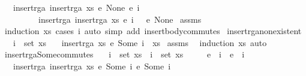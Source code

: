 \begin{isabellebody}
\ \ \ {\isachardoublequoteopen}insert{\isacharunderscore}rga\ {\isacharparenleft}insert{\isacharunderscore}rga\ xs\ {\isacharparenleft}e{}{\isacharcomma}\ None{\isacharparenright}{\isacharparenright}\ {\isacharparenleft}e{}{\isacharcomma}\ i{}\ \ {\isacharparenright}\ {\isacharequal}\isanewline
\ \ \ \ \ \ \ \ \ insert{\isacharunderscore}rga\ {\isacharparenleft}insert{\isacharunderscore}rga\ xs\ {\isacharparenleft}e{}{\isacharcomma}\ i{}\ \ {\isacharparenright}{\isacharparenright}\ {\isacharparenleft}e{}{\isacharcomma}\ None{\isacharparenright}{\isachardoublequoteclose}\isanewline
%
\isadelimproof
%
\endisadelimproof
%
\isatagproof
{}\isamarkupfalse%
\ assms\ \isamarkupfalse%
\ {\isacharparenleft}induction\ xs{\isacharsemicolon}\ cases\ i{}{\isacharparenright}\ {\isacharparenleft}auto\ simp\ add{\isacharcolon}\ insert{\isacharunderscore}body{\isacharunderscore}commutes{\isacharparenright}%
\endisatagproof
{\isafoldproof}%
%
\isadelimproof
\isanewline
%
\endisadelimproof
\isanewline
{}\isamarkupfalse%
\ insert{\isacharunderscore}rga{\isacharunderscore}nonexistent{\isacharcolon}\isanewline
\ \ \ {\isachardoublequoteopen}i\ {\isasymnotin}\ set\ xs{\isachardoublequoteclose}\isanewline
\ \ \ {\isachardoublequoteopen}insert{\isacharunderscore}rga\ xs\ {\isacharparenleft}e{\isacharcomma}\ Some\ i{\isacharparenright}\ {\isacharequal}\ xs{\isachardoublequoteclose}\isanewline
%
\isadelimproof
%
\endisadelimproof
%
\isatagproof
{}\isamarkupfalse%
\ assms\ \isamarkupfalse%
\ {\isacharparenleft}induction\ xs{\isacharcomma}\ auto{\isacharparenright}%
\endisatagproof
{\isafoldproof}%
%
\isadelimproof
\isanewline
%
\endisadelimproof
\isanewline
{}\isamarkupfalse%
\ insert{\isacharunderscore}rga{\isacharunderscore}Some{\isacharunderscore}commutes{\isacharcolon}\isanewline
\ \ \ {\isachardoublequoteopen}i{}\ {\isasymin}\ set\ xs{\isachardoublequoteclose}\ \ {\isachardoublequoteopen}i{}\ {\isasymin}\ set\ xs{\isachardoublequoteclose}\isanewline
\ \ \ \ \ {\isachardoublequoteopen}e{}\ {\isasymnoteq}\ i{}{\isachardoublequoteclose}\ \ {\isachardoublequoteopen}e{}\ {\isasymnoteq}\ i{}{\isachardoublequoteclose}\isanewline
\ \ \ {\isachardoublequoteopen}insert{\isacharunderscore}rga\ {\isacharparenleft}insert{\isacharunderscore}rga\ xs\ {\isacharparenleft}e{}{\isacharcomma}\ Some\ i{}{\isacharparenright}{\isacharparenright}\ {\isacharparenleft}e{}{\isacharcomma}\ Some\ i{}{\isacharparenright}\ {\isacharequal}\isanewline

\end{isabellebody}
